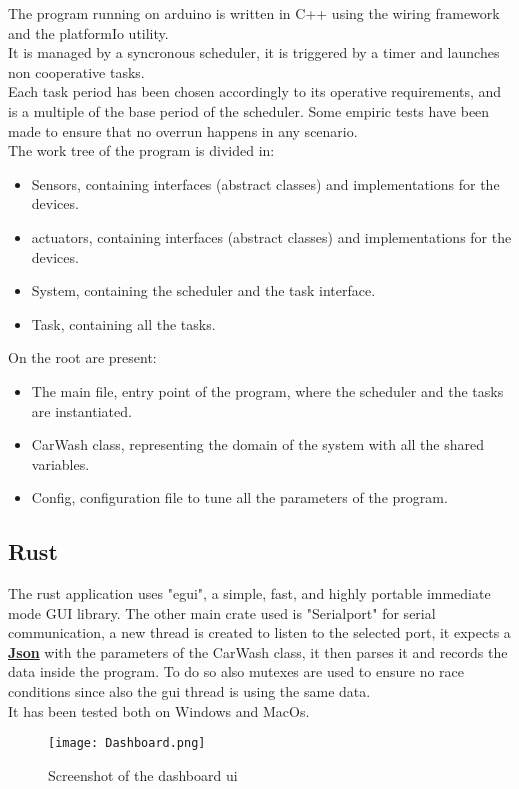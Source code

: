 The program running on arduino is written in C++ using the wiring framework and the platformIo utility.\\
It is managed by a syncronous scheduler, it is triggered by a timer and launches non cooperative tasks.\\
Each task period has been chosen accordingly to its operative requirements, and is a multiple of the base period of the scheduler.
Some empiric tests have been made to ensure that no overrun happens in any scenario.\\
The work tree of the program is divided in:
\begin{itemize}
    \item Sensors, containing interfaces (abstract classes) and implementations for the devices.
    \item actuators, containing interfaces (abstract classes) and implementations for the devices.
    \item System, containing the scheduler and the task interface.
    \item Task, containing all the tasks.
\end{itemize}
On the root are present:
\begin{itemize}
    \item The main file, entry point of the program, where the scheduler and the tasks are instantiated.
    \item CarWash class, representing the domain of the system with all the shared variables.
    \item Config, configuration file to tune all the parameters of the program.
\end{itemize}
\pagebreak
\subsection{Rust}
The rust application uses "egui", a simple, fast, and highly portable immediate mode GUI library.
The other main crate used is "Serialport" for serial communication, a new thread is created to listen to the selected port,
it expects a \underline{\textbf{Json}} with the parameters of the CarWash class, it then parses it and records the data inside the program.
To do so also mutexes are used to ensure no race conditions since also the gui thread is using the same data.\\
It has been tested both on Windows and MacOs.
\begin{figure}[H]
    \centering
    \texttt{[image: Dashboard.png]}
    \caption{Screenshot of the dashboard ui}
\end{figure}

